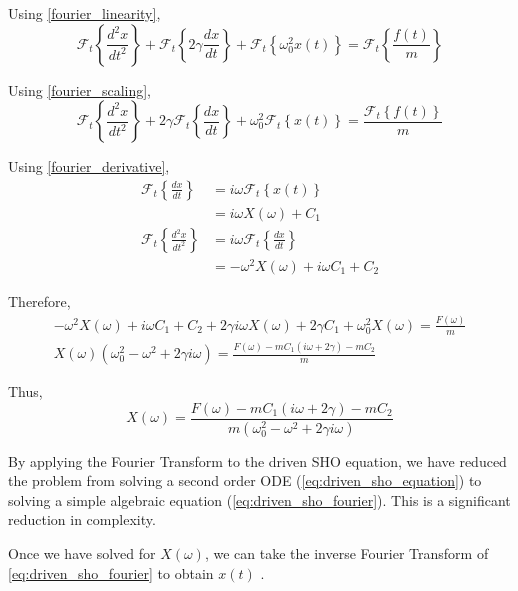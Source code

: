 \noindent
Using \cref{fourier_linearity},
\begin{equation} 
    \mathcal{F}_t \left\{ \frac{d^2 x}{dt^2} \right\} + \mathcal{F}_t \left\{ 2 \gamma \frac{dx}{dt} \right\} + \mathcal{F}_t \left\{ \omega_0^2 x(t) \right\} = \mathcal{F}_t \left\{ \frac{f(t)}{m} \right\}
\end{equation}

\noindent
Using \cref{fourier_scaling},
\begin{equation} 
    \mathcal{F}_t \left\{ \frac{d^2 x}{dt^2} \right\} + 2 \gamma \mathcal{F}_t \left\{ \frac{dx}{dt} \right\} + \omega_0^2 \mathcal{F}_t \left\{ x(t) \right\} = \frac{\mathcal{F}_t \left\{ f(t) \right\}}{m} 
\end{equation}

\noindent
Using \cref{fourier_derivative},
\begin{align}
    \mathcal{F}_t \left\{ \frac{dx}{dt} \right\} &= i \omega \mathcal{F}_t \left\{ x(t) \right\} \\
    &= i \omega X(\omega) + C_1 \\
    \mathcal{F}_t \left\{ \frac{d^2 x}{d t^2} \right\} & = i \omega \mathcal{F}_t \left\{ \frac{dx}{dt} \right\} \\
    & = -\omega^2 X(\omega) + i \omega C_1 + C_2
\end{align}

\noindent
Therefore,
\begin{align}
    -\omega^2 X(\omega) + i \omega C_1 + C_2 + 2 \gamma i \omega X(\omega) + 2 \gamma C_1 + \omega_0^2 X(\omega) = \frac{F(\omega)}{m} \\
    X(\omega) \left( \omega_0^2 - \omega^2 + 2 \gamma i \omega \right) = \frac{F(\omega) - m C_1 \left( i \omega + 2 \gamma \right) - m C_2}{m}
\end{align}

\noindent
Thus,
\begin{equation} \label{eq:driven_sho_fourier}
    X(\omega) = \frac{F(\omega) - m C_1 \left( i \omega + 2 \gamma \right) - m C_2}{m \left( \omega_0^2 - \omega^2 + 2 \gamma i \omega \right)}
\end{equation}

By applying the Fourier Transform to the driven SHO equation, we have reduced the problem from solving a second order ODE (\cref{eq:driven_sho_equation}) to solving a simple algebraic equation (\cref{eq:driven_sho_fourier}). This is a significant reduction in complexity.

Once we have solved for \(X(\omega)\), we can take the inverse Fourier Transform of \cref{eq:driven_sho_fourier} to obtain \(x(t)\) \citep{Libretexts_2021a}.

